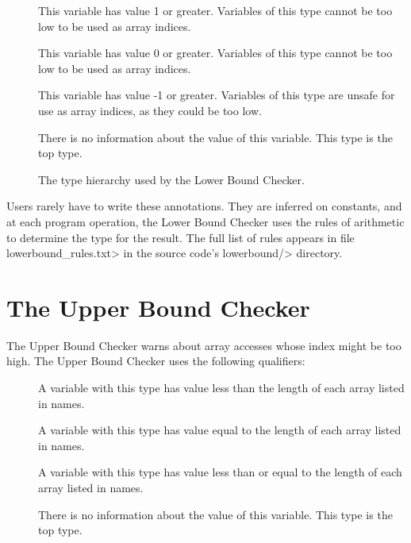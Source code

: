 \begin{description}
\item[]
  This variable has value 1 or greater.
  Variables of this type cannot be too low to be used as array indices.
\item[]
  This variable has value 0 or greater.
  Variables of this type cannot be too low to be used as array indices.
\item[]
  This variable has value -1 or greater.
  Variables of this type are unsafe for use as array indices, as they could be too low.
\item[]
  There is no information about the value of this variable.
  This type is the top type.
\end{description}

\begin{figure}
\caption{The type hierarchy used by the Lower Bound Checker.}
\label{fig-lowerbound-types}
\end{figure}

Users rarely have to write these annotations.  They are inferred on
constants, and at each program operation, the Lower Bound
Checker uses the rules of arithmetic to determine the type for the result.
The full list of rules appears in file \<lowerbound\_rules.txt> in the
source code's \<lowerbound/> directory.

\section{The Upper Bound Checker\label{index-upperbound}}

The Upper Bound Checker warns about array accesses whose index might be
too high. The Upper Bound Checker uses the following
qualifiers:

\begin{description}
\item[]
  A variable with this type
  has value less than the length of each array listed in names.
\item[]
  A variable with this type
  has value equal to the length of each array listed in names.
\item[]
  A variable with this type
  has value less than or equal to the length of each array listed in names.
\item[]
  There is no information about the value of this variable.
  This type is the top type.
\end{description}
